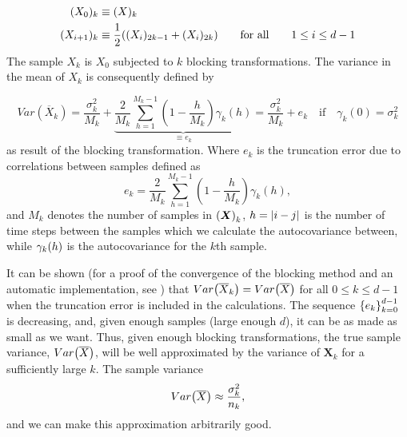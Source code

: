 \begin{align*}
(X_0)_k &\equiv (X)_k \nonumber \\
(X_{i+1})_k &\equiv \frac{1}{2}\qty( (X_i)_{2k-1} +
(X_i)_{2k} ) \qquad \text{for all} \qquad 1 \leq i \leq d-1
\label{eq:recursiveX}
\end{align*}
The sample $X_k$ is $X_0$ subjected to $k$ blocking transformations.
The variance in the mean of $X_k$ is consequently defined by

\begin{equation*}
Var(\overline{X}_k) = \frac{\sigma_k^2}{M_k} + \underbrace{\frac{2}{M_k} \sum_{h=1}^{M_k-1}\left( 1 - \frac{h}{M_k} \right)\gamma_k(h)}_{\equiv e_k} = \frac{\sigma^2_k}{M_k} + e_k \quad \text{if} \quad \gamma_k(0) = \sigma_k^2
\label{eq:var_bloc} 
\end{equation*}
as result of the blocking transformation. Where $e_k$ is the truncation error due to correlations between samples defined as
\begin{equation*}
e_k = \frac{2}{M_k} \sum_{h=1}^{M_k-1}\left( 1 - \frac{h}{M_k} \right)\gamma_k(h), 
\label{eq:truncartion} 
\end{equation*}
and $M_k$ denotes the number of samples in $\qty(\bm{X})_k$, $h=\abs{i-j}$ is the number of time steps between the samples which we calculate the autocovariance between, while $\gamma_k\qty(h)$ is the autocovariance for the $k$th sample. 

It can be shown (for a proof of the convergence of the blocking method and an automatic implementation, see \citep{MariusJonsson}) that $Var\qty(\overline{X}_k)=Var\qty(\overline{X})$  for all $0 \leq k \leq d-1$ when the truncation error is included in the calculations. The sequence $\qty{e_k}_{k=0}^{d-1}$ is decreasing, and, given enough samples (large enough $d$), it can be as made as small as we want. Thus, given enough blocking transformations, the true sample variance, $Var\qty(\overline{X})$, will be well approximated by the variance of $\bm{X}_k$ for a sufficiently large $k$. The sample variance 
\begin{equation}
    Var\qty(\overline{X}) \approx \frac{\sigma_k^2}{n_k}, 
\end{equation}
and we can make this approximation arbitrarily good.




